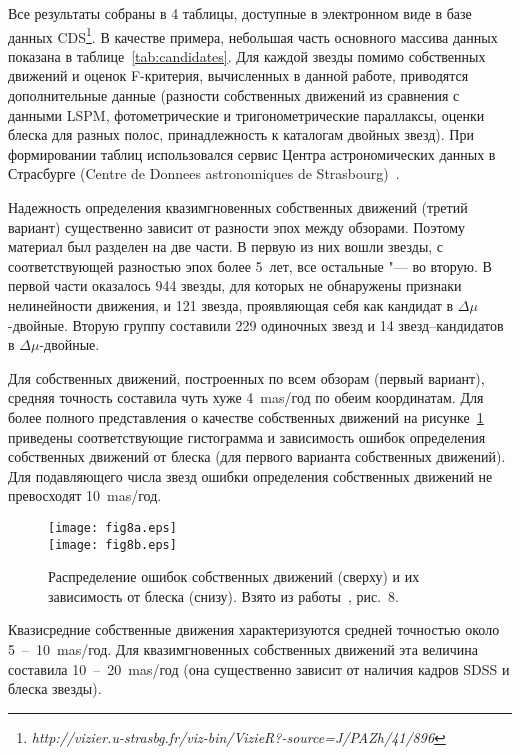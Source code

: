 Все результаты собраны в 4 таблицы, доступные в электронном виде в базе данных CDS\footnote{\textit{http://vizier.u-strasbg.fr/viz-bin/VizieR?-source=J/PAZh/41/896}}. В качестве примера, небольшая часть основного массива данных показана в таблице~\ref{tab:candidates}. Для каждой звезды помимо собственных движений и оценок F-критерия, вычисленных в данной работе, приводятся дополнительные данные (разности собственных движений из сравнения с данными LSPM, фотометрические и тригонометрические параллаксы, оценки блеска для разных полос, принадлежность к каталогам двойных звезд). При формировании таблиц использовался сервис Центра астрономических данных в Страсбурге (Centre de Donnees astronomiques de Strasbourg)~\cite{2000A&AS..143...23O}.

Надежность определения квазимгновенных собственных движений (третий вариант) существенно зависит от разности эпох между обзорами. Поэтому материал был разделен на две части. В первую из них вошли звезды, с соответствующей разностью эпох более 5~лет, все остальные "--- во вторую. В первой части оказалось 944 звезды, для которых не обнаружены признаки нелинейности движения, и 121 звезда, проявляющая себя как кандидат в $\Delta\mu$-двойные. Вторую группу составили 229 одиночных звезд  и 14 звезд--кандидатов в $\Delta\mu$-двойные.

Для собственных движений, построенных по всем обзорам (первый вариант), средняя точность составила чуть хуже 4~mas/год по обеим координатам. Для более полного представления о качестве собственных движений на рисунке~\ref{fig:15emu} приведены соответствующие гистограмма и зависимость ошибок определения собственных движений от блеска (для первого варианта собственных движений). Для подавляющего числа звезд ошибки определения собственных движений не превосходят 10~mas/год.

\begin{figure}[h]
\centering
\texttt{[image: fig8a.eps]}\\
\texttt{[image: fig8b.eps]}
\caption{Распределение ошибок собственных движений (сверху) и их зависимость от блеска (снизу). Взято из работы~\cite{2015AstL...41..833K}, рис.~8.}
\label{fig:15emu}
\end{figure}

Квазисредние собственные движения характеризуются средней точностью около 5~--~10~mas/год. Для квазимгновенных собственных движений эта величина составила 10~--~20~mas/год (она существенно зависит от наличия кадров SDSS и блеска звезды).

